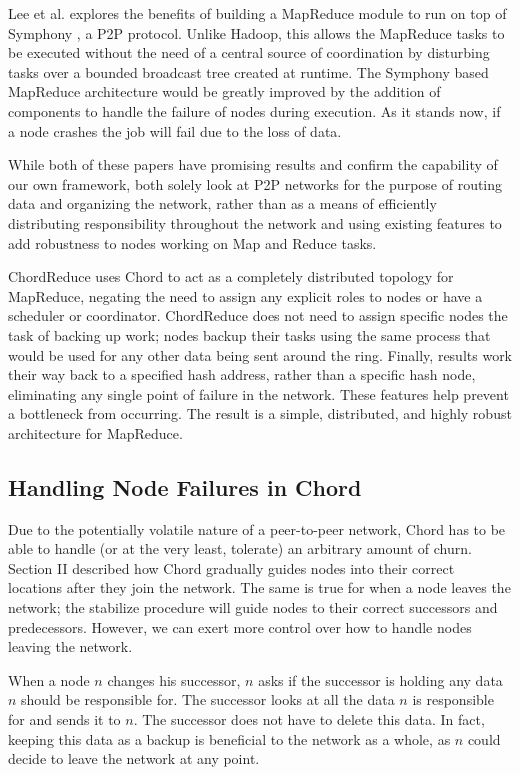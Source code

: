 \documentclass[10pt, conference, compsocconf]{IEEEtran}
\begin{document}
Lee et al. \cite{leemap} explores the benefits of building a MapReduce module to run on top of Symphony \cite{symphony},  a P2P protocol.  Unlike Hadoop, this allows the MapReduce tasks to be executed without the need of a central source of coordination by disturbing tasks over a bounded broadcast tree created at runtime.  The Symphony based MapReduce architecture would be greatly improved by the addition of components to handle the failure of nodes during execution.  As it stands now, if a node crashes the job will fail due to the loss of data.

While both of these papers have promising results and confirm the capability of our own framework, both solely look at P2P networks for the purpose of routing data and organizing the network, rather than as a means of efficiently distributing responsibility throughout the network and using existing features to add robustness to nodes working on Map and Reduce tasks.  

ChordReduce uses Chord to act as a completely distributed topology for MapReduce, negating the need to assign any explicit roles to nodes or have a scheduler or coordinator.  ChordReduce does not need to assign specific nodes the task of backing up work; nodes backup their tasks using the same process that would be used for any other data being sent around the ring.  Finally, results work their way back to a specified hash address, rather than a specific hash node, eliminating any single point of failure in the network.  These features help prevent a bottleneck from occurring. The result is a simple, distributed, and highly robust architecture for MapReduce.


\subsection{Handling Node Failures in Chord}
Due to the potentially volatile nature of a peer-to-peer network, Chord has to be able to handle (or at the very least, tolerate) an arbitrary amount of churn.  Section II described how Chord gradually guides nodes into their correct locations after they join the network.  The same is true for when a node leaves the network; the stabilize procedure will guide nodes to their correct successors and predecessors.  However, we can exert more control over how to handle nodes leaving the network.

When a node $n$ changes his successor, $n$ asks if the successor is holding any data $n$ should be responsible for.  The successor looks at all the data $n$ is responsible for and sends it to $n$.  The successor does not have to delete this data. In fact, keeping this data as a backup is beneficial to the network as a whole, as $n$ could decide to leave the network at any point. 
\end{document}

